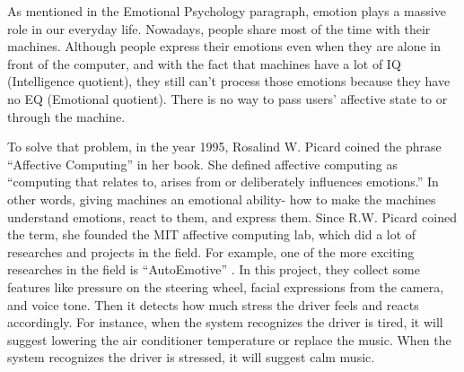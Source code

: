 \documentclass[../main.tex]{subfiles}
\begin{document}
As mentioned in the Emotional Psychology paragraph, emotion plays a massive role in our everyday life.
Nowadays, people share most of the time with their machines. Although people express their emotions 
even when they are alone in front of the computer, and with the fact that machines have a lot of 
IQ (Intelligence quotient), they still can’t process those emotions because they have no EQ (Emotional quotient). 
There is no way to pass users’ affective state to or through the machine.
\par

To solve that problem, in the year 1995, Rosalind W. Picard coined the phrase “Affective Computing” 
in her book\cite{affective_computing_book}. She defined affective computing as “computing that relates to, 
arises from or deliberately influences emotions.” In other words, giving machines an emotional ability- 
how to make the machines understand emotions, react to them, and express them. 
Since R.W. Picard coined the term, she founded the MIT affective computing lab, which did a lot of
researches and projects in the field. For example, one of the more exciting
researches in the field is “AutoEmotive” \cite{AutoEmotive}. In this project, they collect 
some features like pressure on the steering wheel, facial expressions from the camera, 
and voice tone. Then it detects how much stress the driver feels and reacts accordingly. 
For instance, when the system recognizes the driver is tired, it will suggest lowering the air
conditioner temperature or replace the music. When the system recognizes the driver is stressed, it will
suggest calm music.
\end{document}
